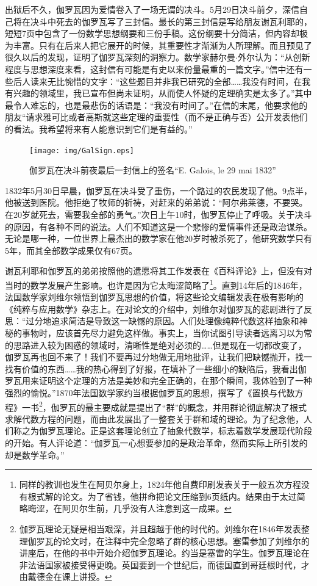 \documentclass{article}
\begin{document}
出狱后不久，伽罗瓦因为爱情卷入了一场无谓的决斗。5月29日决斗前夕，深信自己将在决斗中死去的伽罗瓦写了三封信。最长的第三封信是写给朋友谢瓦利耶的，短短7页中包含了一份数学思想纲要和三份手稿。这份纲要十分简洁，但内容却极为丰富。只有在后来人把它展开的时候，其重要性才渐渐为人所理解。而且预见了很久以后的发现，证明了伽罗瓦深刻的洞察力。数学家赫尔曼$\cdot$外尔认为：“从创新程度与思想深度来看，这封信有可能是有史以来份量最重的一篇文字。”信中还有一些后人读来无比惋惜的文字：“这些题目并非我已研究的全部……我没有时间，在我有兴趣的领域里，我已宣布但尚未证明，从而使人怀疑的定理确实是太多了。”其中最令人难忘的，也是最悲伤的话语是：“我没有时间了。”在信的末尾，他要求他的朋友“请求雅可比或者高斯就这些定理的重要性（而不是正确与否）公开发表他们的看法。我希望将来有人能意识到它们是有益的。”

\begin{figure}[htbp]
 \centering
 \texttt{[image: img/GalSign.eps]}
 \captionsetup{labelformat=empty}
 \caption{伽罗瓦在决斗前夜最后一封信上的签名``E. Galois, le 29 mai 1832''}
 \label{fig:GalSign}
\end{figure}

1832年5月30日早晨，伽罗瓦在决斗受了重伤，一个路过的农民发现了他。9点半，他被送到医院。他拒绝了牧师的祈祷，对赶来的弟弟说：“阿尔弗莱德，不要哭。在20岁就死去，需要我全部的勇气。”次日上午10时，伽罗瓦停止了呼吸。关于决斗的原因，有各种不同的说法。人们不知道这是一个悲惨的爱情事件还是政治谋杀。无论是哪一种，一位世界上最杰出的数学家在他20岁时被杀死了，他研究数学只有5年，而其全部数学成果仅有67页。

谢瓦利耶和伽罗瓦的弟弟按照他的遗愿将其工作发表在《百科评论》上，但没有对当时的数学发展产生影响。也许是因为它太晦涩简略了\footnote{同样的教训也发生在阿贝尔身上，1824年他自费印刷发表关于一般五次方程没有根式解的论文。为了省钱，他拼命把论文压缩到6页纸内。结果由于太过简略晦涩，在阿贝尔生前，几乎没有人注意到这一成果。}。直到14年后的1846年，法国数学家刘维尔领悟到伽罗瓦思想的价值，将这些论文编辑发表在极有影响的《纯粹与应用数学》杂志上。在对论文的介绍中，刘维尔对伽罗瓦的悲剧进行了反思：“过分地追求简洁是导致这一缺憾的原因。人们处理像纯粹代数这样抽象和神秘的事物时，应该首先尽力避免这样做。事实上，当你试图引导读者远离习以为常的思路进入较为困惑的领域时，清晰性是绝对必须的……但是现在一切都改变了，伽罗瓦再也回不来了！我们不要再过分地做无用地批评，让我们把缺憾抛开，找一找有价值的东西……我的热心得到了好报，在填补了一些细小的缺陷后，我看出伽罗瓦用来证明这个定理的方法是美妙和完全正确的，在那个瞬间，我体验到了一种强烈的愉悦。”1870年法国数学家约当根据伽罗瓦的思想，撰写了《置换与代数方程》一书\footnote{伽罗瓦理论无疑是相当艰深，并且超越于他的时代的。刘维尔在1846年发表整理伽罗瓦的论文时，在注释中完全忽略了群的核心思想。塞雷参加了刘维尔的讲座后，在他的书中开始介绍伽罗瓦理论。约当是塞雷的学生。伽罗瓦理论在非法语国家被接受得更晚。英国要到一个世纪后，而德国直到哥廷根时代，才由戴德金在课上讲授。}，伽罗瓦的最主要成就是提出了“群”的概念，并用群论彻底解决了根式求解代数方程的问题，而由此发展出了一整套关于群和域的理论。为了纪念他，人们称之为伽罗瓦理论。正是这套理论创立了抽象代数学，标志着数学发展现代阶段的开始。有人评论道：“伽罗瓦一心想要参加的是政治革命，然而实际上所引发的却是数学革命。\cite{StepanovRose15}”
\end{document}
